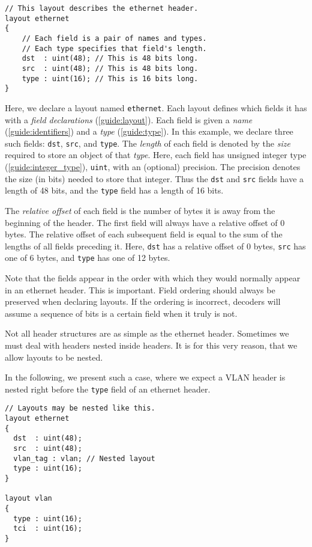\begin{codepage}
\begin{lstlisting}
// This layout describes the ethernet header.
layout ethernet
{
	// Each field is a pair of names and types.
	// Each type specifies that field's length.
	dst  : uint(48); // This is 48 bits long.
	src  : uint(48); // This is 48 bits long.
	type : uint(16); // This is 16 bits long.
}
\end{lstlisting}
\end{codepage}

Here, we declare a layout named \texttt{ethernet}. Each layout defines which fields it has with a \textit{field declarations} (\ref{guide:layout}). Each field is given a \textit{name} (\ref{guide:identifiers}) and a \textit{type} (\ref{guide:type}). In this example, we declare three such fields: \texttt{dst}, \texttt{src}, and \texttt{type}. The \textit{length} of each field is denoted by the \textit{size} required to store an object of that \textit{type}. Here, each field has unsigned integer type (\ref{guide:integer_type}), \texttt{uint}, with an (optional) precision. The precision denotes the size (in bits) needed to store that integer. Thus the \texttt{dst} and \texttt{src} fields have a length of 48 bits, and the \texttt{type} field has a length of 16 bits.

The \textit{relative offset} of each field is the number of bytes it is away from the beginning of the header. The first field will always have a relative offset of 0 bytes. The relative offset of each subsequent field is equal to the sum of the lengths of all fields preceding it. Here, \texttt{dst} has a relative offset of 0 bytes, \texttt{src} has one of 6 bytes, and \texttt{type} has one of 12 bytes.

Note that the fields appear in the order with which they would normally appear in an ethernet header. This is important. Field ordering should always be preserved when declaring layouts. If the ordering is incorrect, decoders will assume a sequence of bits is a certain field when it truly is not.

Not all header structures are as simple as the ethernet header. Sometimes we must deal with headers nested inside headers. It is for this very reason, that we allow layouts to be nested. 

In the following, we present such a case, where we expect a VLAN header \cite{vlan_std} is nested right before the \texttt{type} field of an ethernet header. 

\begin{codepage}
\begin{lstlisting}
// Layouts may be nested like this.
layout ethernet
{
  dst  : uint(48);
  src  : uint(48);
  vlan_tag : vlan; // Nested layout
  type : uint(16);
}

layout vlan
{
  type : uint(16);
  tci  : uint(16);
}
\end{lstlisting}
\end{codepage}

